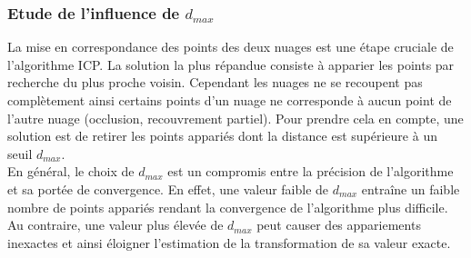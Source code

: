 \subsubsection{Etude de l'influence de $d_{max}$}
La mise en correspondance des points des deux nuages est une étape cruciale de l'algorithme ICP. La solution la plus répandue consiste à apparier les points par recherche du plus proche voisin. Cependant les nuages ne se recoupent pas complètement ainsi certains points d'un nuage ne corresponde à aucun point de l'autre nuage (occlusion, recouvrement partiel). Pour prendre cela en compte, une solution est de retirer les points appariés dont la distance est supérieure à un seuil $d_{max}$.\\
En général, le choix de $d_{max}$ est un compromis entre la précision de l'algorithme et sa portée de convergence. En effet, une valeur faible de $d_{max}$ entraîne un faible nombre de points appariés rendant la convergence de l'algorithme plus difficile. Au contraire, une valeur plus élevée de $d_{max}$ peut causer des appariements inexactes et ainsi éloigner l'estimation de la transformation de sa valeur exacte. 
